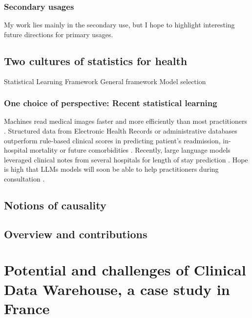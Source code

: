\documentclass{report}
\begin{document}
\subsection{Secondary usages}\label{subsec:intro:secondary_usages}

My work lies mainly in the secondary use, but I hope to highlight interesting future directions for primary usages.


\section{Two cultures of statistics for health}\label{sec:two_cultures}

Statistical Learning Framework
General framework
Model selection
\subsection{One choice of perspective: Recent statistical learning}\label{subsec:intro:recent_statistical_learning}
Machines read medical images faster
and more efficiently than most practitioners \citep{zhou2021review}.
Structured data from Electronic Health Records \citep{rajkomar2018scalable} or
administrative databases \citep{beaulieu2021machine} outperform rule-based
clinical scores in predicting patient's readmission, in-hospital mortality or
future comorbidities \citep{li2020behrt}. Recently, large language models
leveraged clinical notes from several hospitals for length of stay prediction
\citep{jiang2023health}. Hope is high that LLMs models will soon be able to
help practitioners during consultation \citep{lee2023benefits}.



\section{Notions of causality}\label{sec:intro:causality}




\section{Overview and contributions}\label{sec:intro:contributions}



\chapter{Potential and challenges of Clinical Data Warehouse, a case study in France}\label{chapter:cdw}
\end{document}
